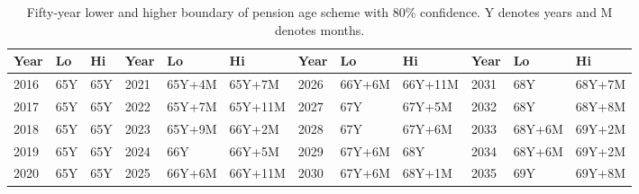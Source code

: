 \documentclass[11pt,a4paper,]{article}
\begin{document}
\begin{table}[t]

\caption{\label{tab:pensionagetables2}Fifty-year lower and higher boundary of pension age scheme with 80\% confidence. Y denotes years and M denotes months.}
\centering
\begin{tabular}{llllllllllll}
\toprule
Year & Lo & Hi & Year & Lo & Hi & Year & Lo & Hi & Year & Lo & Hi\\
\midrule
2016 & 65Y & 65Y & 2021 & 65Y+4M & 65Y+7M & 2026 & 66Y+6M & 66Y+11M & 2031 & 68Y & 68Y+7M\\
2017 & 65Y & 65Y & 2022 & 65Y+7M & 65Y+11M & 2027 & 67Y & 67Y+5M & 2032 & 68Y & 68Y+8M\\
2018 & 65Y & 65Y & 2023 & 65Y+9M & 66Y+2M & 2028 & 67Y & 67Y+6M & 2033 & 68Y+6M & 69Y+2M\\
2019 & 65Y & 65Y & 2024 & 66Y & 66Y+5M & 2029 & 67Y+6M & 68Y & 2034 & 68Y+6M & 69Y+2M\\
2020 & 65Y & 65Y & 2025 & 66Y+6M & 66Y+11M & 2030 & 67Y+6M & 68Y+1M & 2035 & 69Y & 69Y+8M\\
\bottomrule
\end{tabular}
\end{table}
\end{document}
